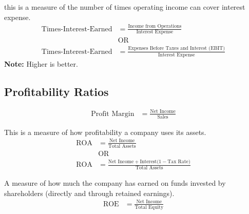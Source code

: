\begin{theorem}
    this is a measure of the number of times operating income can cover interest expense.
    \begin{align}
        \text{Times-Interest-Earned} & = \frac{\text{Income from Operations}}{\text{Interest Expense}}                    \\
                                     & \text{OR}                                                                          \\
        \text{Times-Interest-Earned} & = \frac{\text{Expenses Before Taxes and Interest (EBIT)}}{\text{Interest Expense}}
    \end{align}
    \textbf{Note:} Higher is better.
\end{theorem}

\subsection{Profitability Ratios}

\begin{theorem}
    \begin{align}
        \text{Profit Margin} & = \frac{\text{Net Income}}{\text{Sales}}
    \end{align}
\end{theorem}

\begin{theorem}
    This is a measure of how profitability a company uses its assets.
    \begin{align}
        \text{ROA} & = \frac{\text{Net Income}}{\text{Total Assets}}                                      \\
                   & \text{OR}                                                                            \\
        \text{ROA} & = \frac{\text{Net Income} + \text{Interest}(1-\text{Tax Rate)}}{\text{Total Assets}}
    \end{align}

\end{theorem}

\begin{theorem}
    A measure of how much the company has earned on funds invested by shareholders (directly and through retained earnings).
    \begin{align}
        \text{ROE} & = \frac{\text{Net Income}}{\text{Total Equity}}
    \end{align}
\end{theorem}

